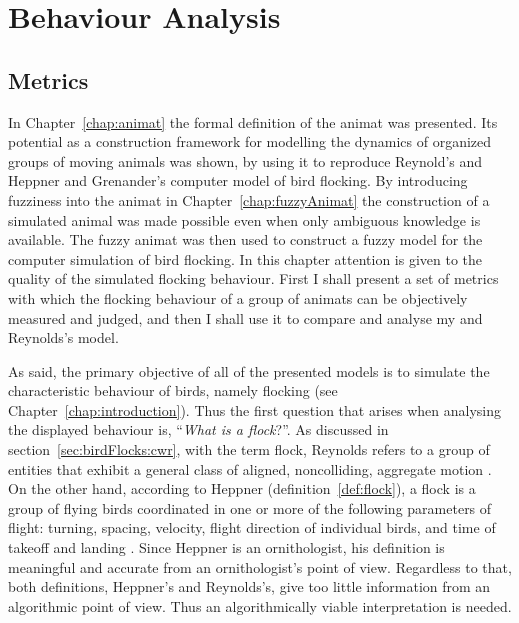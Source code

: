 \graphicspath{{img/}}





\chapter{Behaviour Analysis}
\label{chap:analysis}


\section{Metrics}
\label{sec:analysis:metrics}
In Chapter~\ref{chap:animat} the formal definition of the animat was presented. Its potential as a construction framework for modelling the dynamics of organized groups of moving animals was shown, by using it to reproduce Reynold's \cite{reynolds:1987,reynolds:1999} and Heppner and Grenander's \cite{heppner:1990} computer model of bird flocking. By introducing fuzziness into the animat in Chapter~\ref{chap:fuzzyAnimat} the construction of a simulated animal was made possible even when only ambiguous knowledge is available. The fuzzy animat was then used to construct a fuzzy model for the computer simulation of bird flocking. In this chapter attention is given to the quality of the simulated flocking behaviour. First I shall present a set of metrics with which the flocking behaviour of a group of animats can be objectively measured and judged, and then I shall use it to compare and analyse my and Reynolds's model. 

As said, the primary objective of all of the presented models is to simulate the characteristic behaviour of birds, namely flocking (see Chapter~\ref{chap:introduction}). Thus the first question that arises when analysing the displayed behaviour is, ``\emph{What is a flock}?''. As discussed in section~\ref{sec:birdFlocks:cwr}, with the term flock, Reynolds refers to a group of entities that exhibit a general class of aligned, noncolliding, aggregate motion \cite{reynolds:1987}. On the other hand, according to Heppner (definition~\ref{def:flock}), a flock is a group of flying birds coordinated in one or more of the following parameters of flight: turning, spacing, velocity, flight direction of individual birds, and time of takeoff and landing \cite{heppner:1974a}. Since Heppner is an ornithologist, his definition is meaningful and accurate from an ornithologist's point of view. Regardless to that, both definitions, Heppner's and Reynolds's, give too little information from an algorithmic point of view. Thus an algorithmically viable interpretation is needed.

